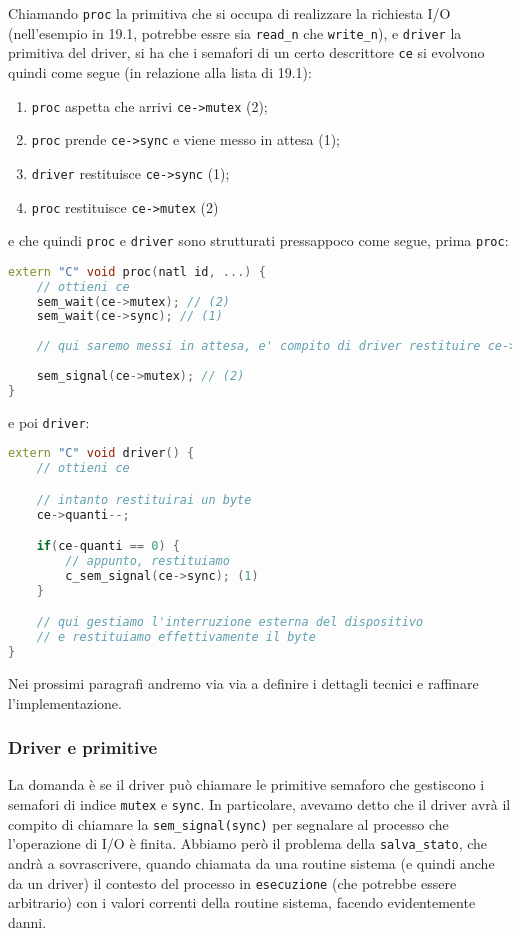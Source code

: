 \documentclass[a4paper,11pt]{article}
\begin{document}
Chiamando \lstinline|proc| la primitiva che si occupa di realizzare la richiesta I/O (nell'esempio in 19.1, potrebbe essre sia \lstinline|read_n| che \lstinline|write_n|), e \lstinline|driver| la primitiva del driver, si ha che i semafori di un certo descrittore \lstinline|ce| si evolvono quindi come segue (in relazione alla lista di 19.1):
\begin{enumerate}
	\item 
	\lstinline|proc| aspetta che arrivi \lstinline|ce->mutex| (2);
	\item
	\lstinline|proc| prende \lstinline|ce->sync| e viene messo in attesa (1);
	\item
	\lstinline|driver| restituisce \lstinline|ce->sync| (1);
	\item
	\lstinline|proc| restituisce \lstinline|ce->mutex| (2)
\end{enumerate}
e che quindi \lstinline|proc| e \lstinline|driver| sono strutturati pressappoco come segue, prima \lstinline|proc|:
\begin{lstlisting}[language=C++, style=codestyle]	
extern "C" void proc(natl id, ...) {
	// ottieni ce
	sem_wait(ce->mutex); // (2)
	sem_wait(ce->sync); // (1)
	
	// qui saremo messi in attesa, e' compito di driver restituire ce->sync
	
	sem_signal(ce->mutex); // (2)
}
\end{lstlisting}
e poi \lstinline|driver|:
\begin{lstlisting}[language=C++, style=codestyle]	
extern "C" void driver() {
	// ottieni ce

	// intanto restituirai un byte
	ce->quanti--;

	if(ce-quanti == 0) {
		// appunto, restituiamo
		c_sem_signal(ce->sync); (1)
	}

	// qui gestiamo l'interruzione esterna del dispositivo
	// e restituiamo effettivamente il byte
}
\end{lstlisting}

Nei prossimi paragrafi andremo via via a definire i dettagli tecnici e raffinare l'implementazione.

\subsubsection{Driver e primitive}
La domanda è se il driver può chiamare le primitive semaforo che gestiscono i semafori di indice \lstinline|mutex| e \lstinline|sync|.
In particolare, avevamo detto che il driver avrà il compito di chiamare la \lstinline|sem_signal(sync)| per segnalare al processo che l'operazione di I/O è finita.
Abbiamo però il problema della \lstinline|salva_stato|, che andrà a sovrascrivere, quando chiamata da una routine sistema (e quindi anche da un driver) il contesto del processo in \lstinline|esecuzione| (che potrebbe essere arbitrario) con i valori correnti della routine sistema, facendo evidentemente danni. 
\end{document}
